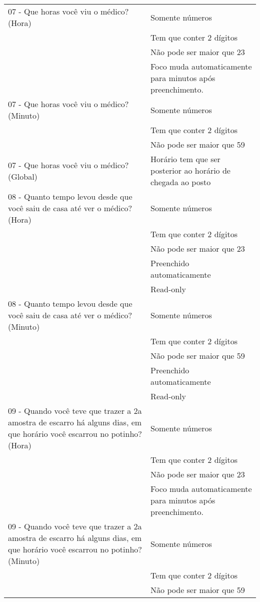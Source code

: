\begin{longtable}{p{}|p{}}
07 - Que horas você viu o médico? (Hora) & Somente números \\ \cline{2-2}  & Tem que conter 2 dígitos \\ \cline{2-2} & Não pode ser maior que 23 \\ \cline{2-2} & Foco muda automaticamente para minutos após preenchimento.  \\ \hline
07 - Que horas você viu o médico? (Minuto) & Somente números \\ \cline{2-2}  & Tem que conter 2 dígitos \\ \cline{2-2} & Não pode ser maior que 59 \\ \hline
07 - Que horas você viu o médico? (Global) & Horário tem que ser posterior ao horário de chegada ao posto \\ \hline

08 - Quanto tempo levou desde que você saiu de casa até ver o médico? (Hora) & Somente números \\ \cline{2-2}  & Tem que conter 2 dígitos \\ \cline{2-2} & Não pode ser maior que 23 \\ \cline{2-2} & Preenchido automaticamente  \\ \cline{2-2} & Read-only\\ \hline
08 - Quanto tempo levou desde que você saiu de casa até ver o médico? (Minuto) & Somente números \\ \cline{2-2}  & Tem que conter 2 dígitos \\ \cline{2-2} & Não pode ser maior que 59 \\ \cline{2-2} & Preenchido automaticamente  \\ \cline{2-2} & Read-only \\ \hline 

09 - Quando você teve que trazer a 2a amostra de escarro há alguns dias, em que horário você escarrou no potinho? (Hora) & Somente números \\ \cline{2-2}  & Tem que conter 2 dígitos \\ \cline{2-2} & Não pode ser maior que 23 \\ \cline{2-2} & Foco muda automaticamente para minutos após preenchimento.  \\ \hline
09 - Quando você teve que trazer a 2a amostra de escarro há alguns dias, em que horário você escarrou no potinho? (Minuto) & Somente números \\ \cline{2-2}  & Tem que conter 2 dígitos \\ \cline{2-2} & Não pode ser maior que 59 \\ \hline


\end{longtable}
